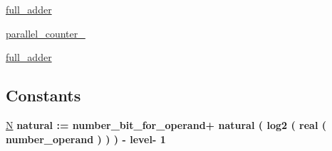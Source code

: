 \begin{DoxyCompactItemize}
\item 
\hypertarget{group___majority_voter_gafc1dc8c8d5b91fffc35f2b2eede724ce}{\hyperlink{group___majority_voter_gafc1dc8c8d5b91fffc35f2b2eede724ce}{full\+\_\+adder}  {\bfseries }  }\label{group___majority_voter_gafc1dc8c8d5b91fffc35f2b2eede724ce}

\item 
\hypertarget{group___majority_voter_ga33875bebede9b27e9a645ca5d664c93e}{\hyperlink{group___majority_voter_ga33875bebede9b27e9a645ca5d664c93e}{parallel\+\_\+counter\+\_}  {\bfseries }  }\label{group___majority_voter_ga33875bebede9b27e9a645ca5d664c93e}

\item 
\hypertarget{group___majority_voter_gafc1dc8c8d5b91fffc35f2b2eede724ce}{\hyperlink{group___majority_voter_gafc1dc8c8d5b91fffc35f2b2eede724ce}{full\+\_\+adder}  {\bfseries }  }\label{group___majority_voter_gafc1dc8c8d5b91fffc35f2b2eede724ce}

\end{DoxyCompactItemize}
\subsection*{Constants}
 \begin{DoxyCompactItemize}
\item 
\hypertarget{group___majority_voter_gad3f7d3a495e10fb501393b29e545970c}{\hyperlink{group___majority_voter_gad3f7d3a495e10fb501393b29e545970c}{N} {\bfseries \textcolor{vhdlchar}{natural}\textcolor{vhdlchar}{ }\textcolor{vhdlchar}{ }\textcolor{vhdlchar}{\+:}\textcolor{vhdlchar}{=}\textcolor{vhdlchar}{ }\textcolor{vhdlchar}{ }\textcolor{vhdlchar}{ }\textcolor{vhdlchar}{ }\textcolor{vhdlchar}{number\+\_\+bit\+\_\+for\+\_\+operand}\textcolor{vhdlchar}{+}\textcolor{vhdlchar}{ }\textcolor{vhdlchar}{ }\textcolor{vhdlchar}{ }\textcolor{vhdlchar}{natural}\textcolor{vhdlchar}{ }\textcolor{vhdlchar}{(}\textcolor{vhdlchar}{ }\textcolor{vhdlchar}{log2}\textcolor{vhdlchar}{ }\textcolor{vhdlchar}{(}\textcolor{vhdlchar}{ }\textcolor{vhdlchar}{real}\textcolor{vhdlchar}{ }\textcolor{vhdlchar}{(}\textcolor{vhdlchar}{ }\textcolor{vhdlchar}{number\+\_\+operand}\textcolor{vhdlchar}{ }\textcolor{vhdlchar}{ }\textcolor{vhdlchar}{)}\textcolor{vhdlchar}{ }\textcolor{vhdlchar}{ }\textcolor{vhdlchar}{ }\textcolor{vhdlchar}{)}\textcolor{vhdlchar}{ }\textcolor{vhdlchar}{ }\textcolor{vhdlchar}{ }\textcolor{vhdlchar}{)}\textcolor{vhdlchar}{ }\textcolor{vhdlchar}{-\/}\textcolor{vhdlchar}{ }\textcolor{vhdlchar}{ }\textcolor{vhdlchar}{ }\textcolor{vhdlchar}{level}\textcolor{vhdlchar}{-\/}\textcolor{vhdlchar}{ } \textcolor{vhdldigit}{1} \textcolor{vhdlchar}{ }} }\label{group___majority_voter_gad3f7d3a495e10fb501393b29e545970c}

\end{DoxyCompactItemize}
